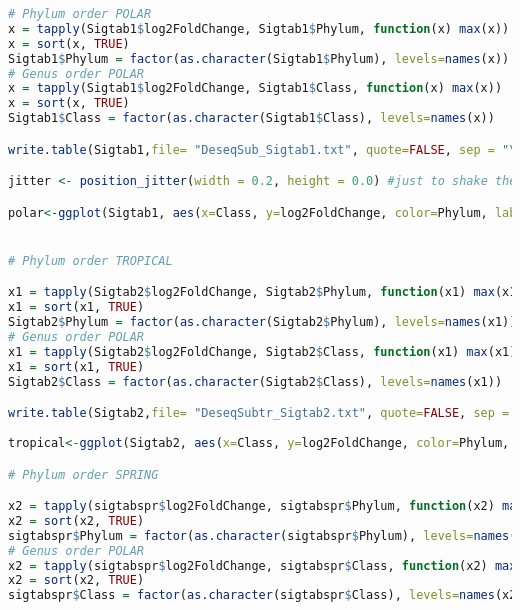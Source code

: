 \documentclass{article}
\begin{document}
\begin{lstlisting}[language=R,caption={N1N2figscripts}]
# Phylum order POLAR
x = tapply(Sigtab1$log2FoldChange, Sigtab1$Phylum, function(x) max(x))
x = sort(x, TRUE)
Sigtab1$Phylum = factor(as.character(Sigtab1$Phylum), levels=names(x))
# Genus order POLAR
x = tapply(Sigtab1$log2FoldChange, Sigtab1$Class, function(x) max(x))
x = sort(x, TRUE)
Sigtab1$Class = factor(as.character(Sigtab1$Class), levels=names(x))

write.table(Sigtab1,file= "DeseqSub_Sigtab1.txt", quote=FALSE, sep = "\t")

jitter <- position_jitter(width = 0.2, height = 0.0) #just to shake the symbols a little bit 

polar<-ggplot(Sigtab1, aes(x=Class, y=log2FoldChange, color=Phylum, label=rownames(Sigtab1), shape=condition)) + geom_point(size=3, position=jitter) + theme(axis.text.x = element_text(angle = -45, hjust = 0, vjust=0.5))+ geom_text(vjust="inward",hjust="inward", size = 2,position=jitter) +geom_hline(yintercept = 0, color="black")+geom_hline(yintercept = c(-5,5), color="red")+ggtitle("subpolar region")+scale_color_manual(name = "Phylum",values=phylumcolors) + coord_flip()


# Phylum order TROPICAL

x1 = tapply(Sigtab2$log2FoldChange, Sigtab2$Phylum, function(x1) max(x1))
x1 = sort(x1, TRUE)
Sigtab2$Phylum = factor(as.character(Sigtab2$Phylum), levels=names(x1))
# Genus order POLAR
x1 = tapply(Sigtab2$log2FoldChange, Sigtab2$Class, function(x1) max(x1))
x1 = sort(x1, TRUE)
Sigtab2$Class = factor(as.character(Sigtab2$Class), levels=names(x1))

write.table(Sigtab2,file= "DeseqSubtr_Sigtab2.txt", quote=FALSE, sep = "\t")
 
tropical<-ggplot(Sigtab2, aes(x=Class, y=log2FoldChange, color=Phylum, label=rownames(Sigtab2), shape=condition)) + geom_text(vjust="inward",hjust="inward", size = 2,position=jitter)+geom_point(size=3,position=jitter) + theme(axis.text.x = element_text(angle = -45, hjust = 0, vjust=0.5)) +geom_hline(yintercept = 0, color="black")+geom_hline(yintercept = c(-5,5), color="red")+ggtitle("subtropical region")+scale_color_manual(name = "Phylum",values=phylumcolors) + coord_flip()

# Phylum order SPRING

x2 = tapply(sigtabspr$log2FoldChange, sigtabspr$Phylum, function(x2) max(x2))
x2 = sort(x2, TRUE)
sigtabspr$Phylum = factor(as.character(sigtabspr$Phylum), levels=names(x2))
# Genus order POLAR
x2 = tapply(sigtabspr$log2FoldChange, sigtabspr$Class, function(x2) max(x2))
x2 = sort(x2, TRUE)
sigtabspr$Class = factor(as.character(sigtabspr$Class), levels=names(x2))
 

\end{lstlisting}
\end{document}
